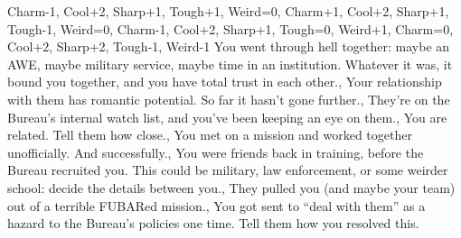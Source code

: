 {{    {Charm-1, Cool+2, Sharp+1, Tough+1, Weird=0},
    {Charm+1, Cool+2, Sharp+1, Tough-1, Weird=0},
    {Charm-1, Cool+2, Sharp+1, Tough=0, Weird+1},
    {Charm=0, Cool+2, Sharp+2, Tough-1, Weird-1}}
%
%
\brln
%
\history%
    {{You went through hell together: maybe an AWE, maybe military service, maybe time in an institution. Whatever it was, it bound you together, and you have total trust in each other.},
    {Your relationship with them has romantic potential. So far it hasn’t gone further.},
    {They’re on the Bureau’s internal watch list, and you’ve been keeping an eye on them.},
    {You are related. Tell them how close.},
    {You met on a mission and worked together unofficially. And successfully.},
    {You were friends back in training, before the Bureau recruited you. This could be military, law enforcement, or some weirder school: decide the details between you.},
    {They pulled you (and maybe your team) out of a terrible FUBARed mission.},
    {You got sent to “deal with them” as a hazard to the Bureau’s policies one time. Tell them how you resolved this.}}%
%
}{%
%
\levelingup
%
%
%
}%
